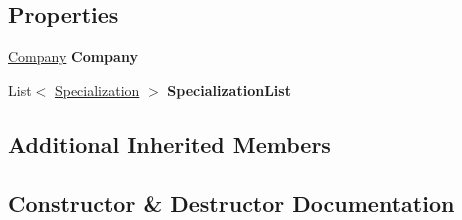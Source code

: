 \subsection*{Properties}
\begin{DoxyCompactItemize}
\item 
\hypertarget{class_baudi_1_1_client_1_1_view_models_1_1_edit_window_view_models_1_1_company_edit_window_view_model_ab4ae3f5edf347940cada61aff473ffc7}{}\hyperlink{class_baudi_1_1_d_a_l_1_1_models_1_1_company}{Company} {\bfseries Company}\label{class_baudi_1_1_client_1_1_view_models_1_1_edit_window_view_models_1_1_company_edit_window_view_model_ab4ae3f5edf347940cada61aff473ffc7}

\item 
\hypertarget{class_baudi_1_1_client_1_1_view_models_1_1_edit_window_view_models_1_1_company_edit_window_view_model_a7bc5947bae9e041e575a56104c8a7105}{}List$<$ \hyperlink{class_baudi_1_1_d_a_l_1_1_models_1_1_specialization}{Specialization} $>$ {\bfseries Specialization\+List}\label{class_baudi_1_1_client_1_1_view_models_1_1_edit_window_view_models_1_1_company_edit_window_view_model_a7bc5947bae9e041e575a56104c8a7105}

\end{DoxyCompactItemize}
\subsection*{Additional Inherited Members}


\subsection{Constructor \& Destructor Documentation}
\hypertarget{class_baudi_1_1_client_1_1_view_models_1_1_edit_window_view_models_1_1_company_edit_window_view_model_a3c710b9ef7ac1a76cc54ac378591cd49}{}
